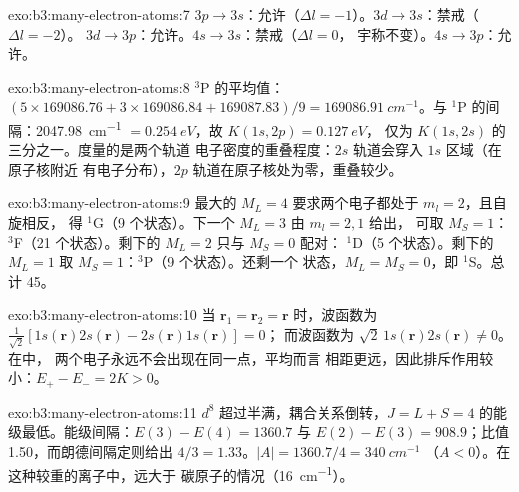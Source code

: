 \begin{solution}{exo:b3:many-electron-atoms:7}
$3p \to 3s$：允许（$\Delta l = -1$）。$3d \to 3s$：禁戒（$\Delta l = -2$）。
$3d \to 3p$：允许。$4s \to 3s$：禁戒（$\Delta l = 0$，
宇称不变）。$4s \to 3p$：允许。
\end{solution}

\begin{solution}{exo:b3:many-electron-atoms:8}
${}^3$P 的平均值：$(5 \times 169086.76 + 3 \times 169086.84 + 169087.83)/9 =
\qty{169086.91}{cm^{-1}}$。与 ${}^1$P 的间隔：\qty{2047.98}{cm^{-1}} $=
\qty{0.254}{eV}$，故 $K(1s,2p) = \qty{0.127}{eV}$，
仅为 $K(1s,2s)$ 的三分之一。度量的是两个轨道
电子密度的重叠程度：$2s$ 轨道会穿入 $1s$ 区域（在原子核附近
有电子分布），$2p$ 轨道在原子核处为零，重叠较少。
\end{solution}

\begin{solution}{exo:b3:many-electron-atoms:9}
最大的 $M_L = 4$ 要求两个电子都处于 $m_l = 2$，且自旋相反，
得 ${}^1$G（9 个状态）。下一个 $M_L = 3$ 由 $m_l = 2, 1$ 给出，
可取 $M_S = 1$：${}^3$F（21 个状态）。剩下的 $M_L = 2$ 只与 $M_S = 0$ 配对：
${}^1$D（5 个状态）。剩下的 $M_L = 1$ 取 $M_S = 1$：${}^3$P（9 个状态）。还剩一个
状态，$M_L = M_S = 0$，即 ${}^1$S。总计 45。
\end{solution}

\begin{solution}{exo:b3:many-electron-atoms:10}
当 $\mathbf r_1 = \mathbf r_2 = \mathbf r$ 时，波函数为
$\frac{1}{\sqrt2}[1s(\mathbf r)2s(\mathbf r) - 2s(\mathbf r)1s(\mathbf r)] = 0$；
而波函数为 $\sqrt2\,1s(\mathbf r)2s(\mathbf r) \ne 0$。在中，
两个电子永远不会出现在同一点，平均而言
相距更远，因此排斥作用较小：$E_+ - E_- = 2K > 0$。
\end{solution}

\begin{solution}{exo:b3:many-electron-atoms:11}
$d^8$ 超过半满，耦合关系倒转，$J = L + S = 4$
的能级最低。能级间隔：$E(3) - E(4) = 1360.7$ 与 $E(2) - E(3) = 908.9$；比值
1.50，而朗德间隔定则给出 $4/3 = 1.33$。$|A| = 1360.7/4 = \qty{340}{cm^{-1}}$
（$A < 0$）。在这种较重的离子中，远大于
碳原子的情况（\qty{16}{cm^{-1}}）。
\end{solution}

